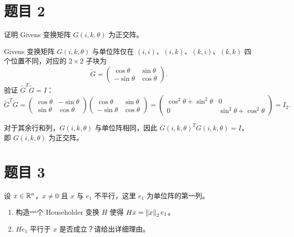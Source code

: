 \documentclass{article}
\begin{document}
\section{题目 2}

证明 Givens 变换矩阵 $G(i, k, \theta)$ 为正交阵。

\begin{solution}

  Givens 变换矩阵 $G(i, k, \theta)$ 与单位阵仅在
  $(i,i)$、$(i,k)$、$(k,i)$、$(k,k)$ 四个位置不同，对应的 $2 \times 2$ 子块为
  \[
    \widetilde{G} =
    \begin{pmatrix} \cos\theta & \sin\theta \\ -\sin\theta & \cos\theta
    \end{pmatrix}.
  \]
  验证 $\widetilde{G}^T \widetilde{G} = I$：
  \[
    \widetilde{G}^T \widetilde{G}
    =
    \begin{pmatrix} \cos\theta & -\sin\theta \\ \sin\theta & \cos\theta
    \end{pmatrix}
    \begin{pmatrix} \cos\theta & \sin\theta \\ -\sin\theta & \cos\theta
    \end{pmatrix}
    =
    \begin{pmatrix} \cos^2\theta + \sin^2\theta & 0 \\ 0 &
      \sin^2\theta + \cos^2\theta
    \end{pmatrix}
    = I_2.
  \]

  对于其余行和列，$G(i,k,\theta)$ 与单位阵相同，因此 $G(i,k,\theta)^T G(i,k,\theta) =
  I$，即 $G(i,k,\theta)$ 为正交阵。

\end{solution}

\section{题目 3}

设 $x \in \mathbb{R}^n$，$x \neq 0$ 且 $x$ 与 $e_1$ 不平行，这里 $e_1$ 为单位阵的第一列。
\begin{enumerate}
  \item[(1)] 构造一个 Householder 变换 $H$ 使得 $Hx = \left\| x \right\|_2 e_1$。
  \item[(2)] $He_1$ 平行于 $x$ 是否成立？请给出详细理由。
\end{enumerate}
\end{document}
